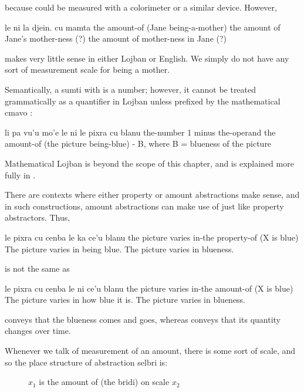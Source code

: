 {\noindent}because  could be measured with a colorimeter or a
    similar device. However,
\begin{example}
le ni la djein. cu mamta \n
the amount-of (Jane being-a-mother)\n
the amount of Jane's mother-ness (?)\n
the amount of mother-ness in Jane (?)
\end{example}

{\noindent}makes very little sense in either Lojban or English. We simply
    do not have any sort of measurement scale for being a mother. 

Semantically, a sumti with  is a number; however,
    it cannot be treated grammatically as a quantifier in Lojban
    unless prefixed by the mathematical cmavo :
\begin{example}
li pa vu'u mo'e\n
\T	le ni le pixra cu blanu \n
the-number 1 minus the-operand\n
\T	the amount-of (the picture being-blue) - B, where B = blueness of the picture
\end{example}

Mathematical Lojban is beyond the scope of this chapter, and
    is explained more fully in .

There are contexts where either property or amount
    abstractions make sense, and in such constructions, amount
    abstractions can make use of  just like property
    abstractors. Thus,
\begin{example}
le pixra cu cenba le ka ce'u blanu \n
the picture varies in-the property-of (X is blue)\n
The picture varies in being blue.\n
The picture varies in blueness.
\end{example}

{\noindent}is not the same as
\begin{example}
le pixra cu cenba le ni ce'u blanu \n
the picture varies in-the amount-of (X is blue)\n
The picture varies in how blue it is.\n
The picture varies in blueness.
\end{example}

 conveys that the blueness comes
    and goes, whereas  conveys that
    its quantity changes over time. 

Whenever we talk of measurement of an amount, there is some
    sort of scale, and so the place structure of  abstraction
    selbri is:
\begin{description}
\item[] $x_1$ is the amount of (the bridi) on scale $x_2$
\end{description}

